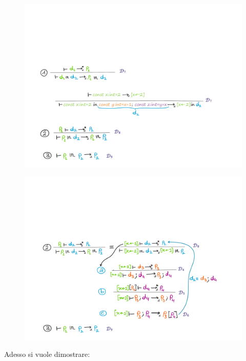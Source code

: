 \documentclass[a4paper]{article}
\begin{document}
	\begin{figure}[!htp]
		\centering
		\includegraphics[width=\textwidth]{img/regola_espressione-ex2.pdf}
	\end{figure}\newpage

	\begin{figure}[!htp]
		\centering
		\includegraphics[width=\textwidth]{img/regola_espressione-ex3.pdf}
	\end{figure}

	\noindent
	Adesso si vuole dimostrare:
	
\end{document}
